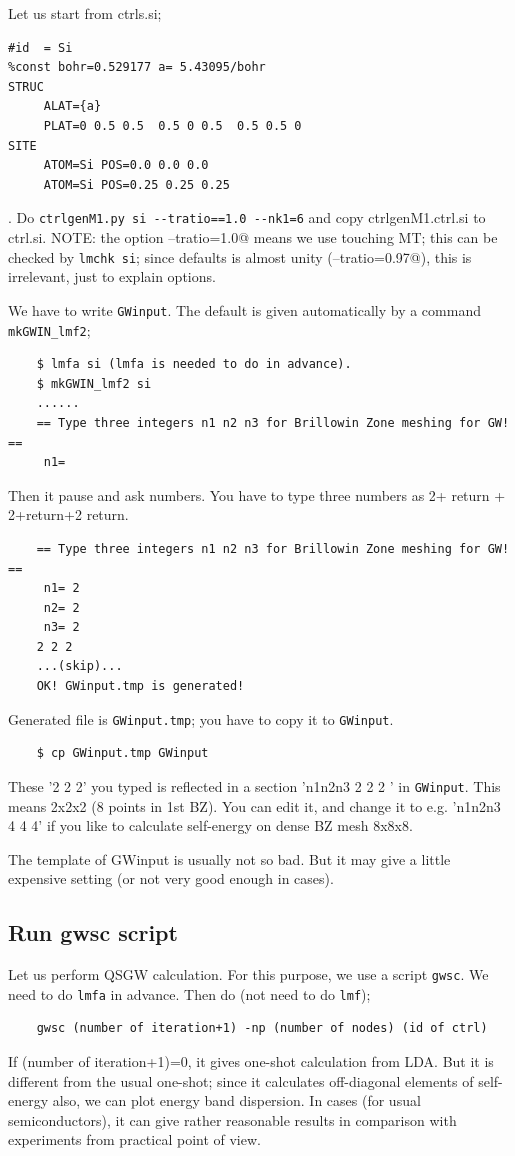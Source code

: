 Let us start from ctrls.si;
\begin{verbatim}
#id  = Si
%const bohr=0.529177 a= 5.43095/bohr
STRUC
     ALAT={a} 
     PLAT=0 0.5 0.5  0.5 0 0.5  0.5 0.5 0 
SITE
     ATOM=Si POS=0.0 0.0 0.0
     ATOM=Si POS=0.25 0.25 0.25
\end{verbatim}
. Do \verb+ctrlgenM1.py si --tratio==1.0 --nk1=6+ and copy ctrlgenM1.ctrl.si to
ctrl.si. {\small NOTE: the option \verb@--tratio=1.0@ means we use touching MT; 
this can be checked by \verb+lmchk si+; since defaults is almost unity 
(\verb@--tratio=0.97@), this is irrelevant, just to explain options.} 

We have to write \verb+GWinput+. The default is given automatically by a
command \verb+mkGWIN_lmf2+;
\begin{verbatim}
    $ lmfa si (lmfa is needed to do in advance).
    $ mkGWIN_lmf2 si
    ......
    == Type three integers n1 n2 n3 for Brillowin Zone meshing for GW! ==
     n1=
\end{verbatim}
Then it pause and ask numbers. You have to type three numbers as
2+ return + 2+return+2 return.
\begin{verbatim}
    == Type three integers n1 n2 n3 for Brillowin Zone meshing for GW! ==
     n1= 2
     n2= 2
     n3= 2
    2 2 2
    ...(skip)...
    OK! GWinput.tmp is generated!
\end{verbatim}
Generated file is \verb+GWinput.tmp+; you have to copy it to \verb+GWinput+.
\begin{verbatim}
    $ cp GWinput.tmp GWinput
\end{verbatim}
These '2 2 2' you typed is reflected in a section 'n1n2n3 2 2 2 ' in
\verb+GWinput+. This means 2x2x2 (8 points in 1st BZ). 
You can edit it, and change it to e.g. 'n1n2n3 4 4 4' if you like to
calculate self-energy on dense BZ mesh 8x8x8. 

The template of GWinput is usually not so bad. But 
it may give a little expensive setting (or not very good enough in cases).


\subsection{Run gwsc script}
\label{fpgw-calc}
Let us perform QSGW calculation. 
For this purpose, we use a script \verb+gwsc+. 
We need to do \verb+lmfa+ in advance. Then do (not need to do \verb+lmf+);
\begin{verbatim}
    gwsc (number of iteration+1) -np (number of nodes) (id of ctrl)
\end{verbatim}
If (number of iteration+1)=0, it gives one-shot calculation from LDA.
But it is different from the usual one-shot;
since it calculates off-diagonal elements of self-energy also,
we can plot energy band dispersion. In cases (for usual
semiconductors), it can give rather reasonable results in comparison with
experiments from practical point of view.

